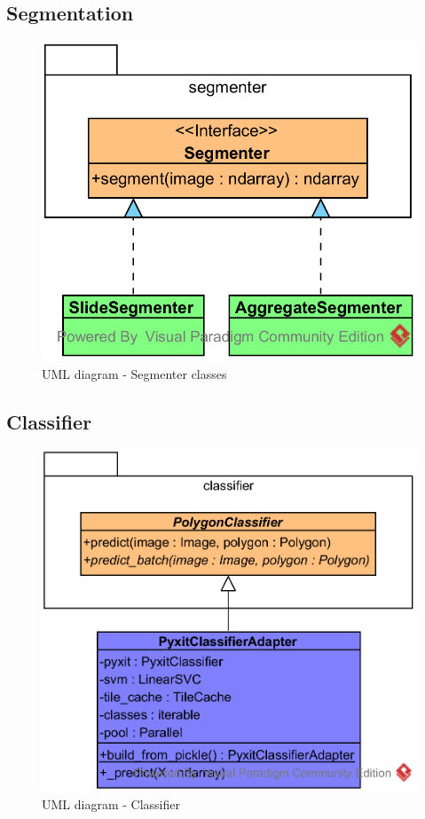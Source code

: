 \subsection{Segmentation}

\begin{figure}
	\center
	\includegraphics[scale=0.85]{image/thyroid_segmenters.png}
	\caption{UML diagram - Segmenter classes}
	\label{fig:uml_cyto_segmenters}
\end{figure}

\subsection{Classifier}

\begin{figure}
	\center
	\includegraphics[scale=0.85]{image/thyroid_classifiers.png}
	\caption{UML diagram - Classifier}
	\label{fig:uml_cyto_classifiers}
\end{figure}

